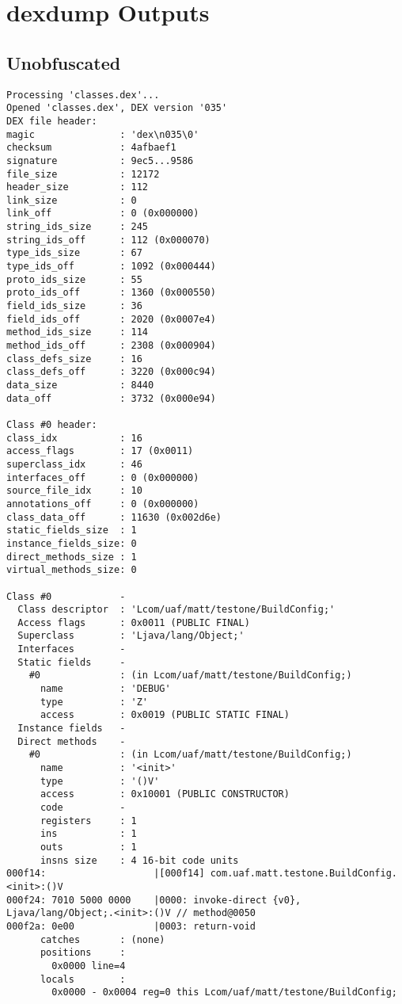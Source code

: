 \section{dexdump Outputs}
\label{app:dexdump}
\subsection{Unobfuscated}
\label{app:dun}
\begin{lstlisting}
Processing 'classes.dex'...
Opened 'classes.dex', DEX version '035'
DEX file header:
magic               : 'dex\n035\0'
checksum            : 4afbaef1
signature           : 9ec5...9586
file_size           : 12172
header_size         : 112
link_size           : 0
link_off            : 0 (0x000000)
string_ids_size     : 245
string_ids_off      : 112 (0x000070)
type_ids_size       : 67
type_ids_off        : 1092 (0x000444)
proto_ids_size      : 55
proto_ids_off       : 1360 (0x000550)
field_ids_size      : 36
field_ids_off       : 2020 (0x0007e4)
method_ids_size     : 114
method_ids_off      : 2308 (0x000904)
class_defs_size     : 16
class_defs_off      : 3220 (0x000c94)
data_size           : 8440
data_off            : 3732 (0x000e94)

Class #0 header:
class_idx           : 16
access_flags        : 17 (0x0011)
superclass_idx      : 46
interfaces_off      : 0 (0x000000)
source_file_idx     : 10
annotations_off     : 0 (0x000000)
class_data_off      : 11630 (0x002d6e)
static_fields_size  : 1
instance_fields_size: 0
direct_methods_size : 1
virtual_methods_size: 0

Class #0            -
  Class descriptor  : 'Lcom/uaf/matt/testone/BuildConfig;'
  Access flags      : 0x0011 (PUBLIC FINAL)
  Superclass        : 'Ljava/lang/Object;'
  Interfaces        -
  Static fields     -
    #0              : (in Lcom/uaf/matt/testone/BuildConfig;)
      name          : 'DEBUG'
      type          : 'Z'
      access        : 0x0019 (PUBLIC STATIC FINAL)
  Instance fields   -
  Direct methods    -
    #0              : (in Lcom/uaf/matt/testone/BuildConfig;)
      name          : '<init>'
      type          : '()V'
      access        : 0x10001 (PUBLIC CONSTRUCTOR)
      code          -
      registers     : 1
      ins           : 1
      outs          : 1
      insns size    : 4 16-bit code units
000f14:                   |[000f14] com.uaf.matt.testone.BuildConfig.<init>:()V
000f24: 7010 5000 0000    |0000: invoke-direct {v0}, Ljava/lang/Object;.<init>:()V // method@0050
000f2a: 0e00              |0003: return-void
      catches       : (none)
      positions     :
        0x0000 line=4
      locals        :
        0x0000 - 0x0004 reg=0 this Lcom/uaf/matt/testone/BuildConfig;


\end{lstlisting}
